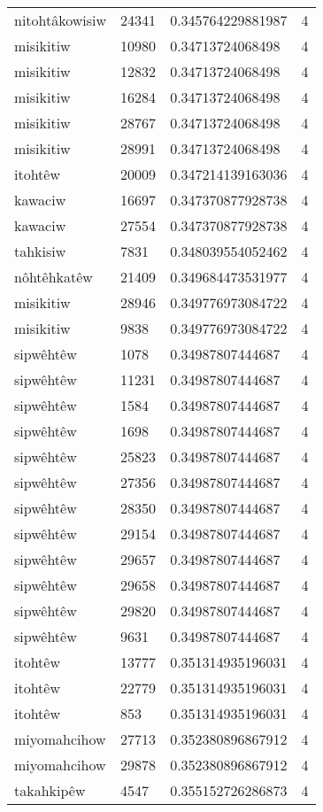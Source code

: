 \begin{longtable}{llll}
nitohtâkowisiw & 24341 & 0.345764229881987 & 4 \\
misikitiw & 10980 & 0.34713724068498 & 4 \\
misikitiw & 12832 & 0.34713724068498 & 4 \\
misikitiw & 16284 & 0.34713724068498 & 4 \\
misikitiw & 28767 & 0.34713724068498 & 4 \\
misikitiw & 28991 & 0.34713724068498 & 4 \\
itohtêw & 20009 & 0.347214139163036 & 4 \\
kawaciw & 16697 & 0.347370877928738 & 4 \\
kawaciw & 27554 & 0.347370877928738 & 4 \\
tahkisiw & 7831 & 0.348039554052462 & 4 \\
nôhtêhkatêw & 21409 & 0.349684473531977 & 4 \\
misikitiw & 28946 & 0.349776973084722 & 4 \\
misikitiw & 9838 & 0.349776973084722 & 4 \\
sipwêhtêw & 1078 & 0.34987807444687 & 4 \\
sipwêhtêw & 11231 & 0.34987807444687 & 4 \\
sipwêhtêw & 1584 & 0.34987807444687 & 4 \\
sipwêhtêw & 1698 & 0.34987807444687 & 4 \\
sipwêhtêw & 25823 & 0.34987807444687 & 4 \\
sipwêhtêw & 27356 & 0.34987807444687 & 4 \\
sipwêhtêw & 28350 & 0.34987807444687 & 4 \\
sipwêhtêw & 29154 & 0.34987807444687 & 4 \\
sipwêhtêw & 29657 & 0.34987807444687 & 4 \\
sipwêhtêw & 29658 & 0.34987807444687 & 4 \\
sipwêhtêw & 29820 & 0.34987807444687 & 4 \\
sipwêhtêw & 9631 & 0.34987807444687 & 4 \\
itohtêw & 13777 & 0.351314935196031 & 4 \\
itohtêw & 22779 & 0.351314935196031 & 4 \\
itohtêw & 853 & 0.351314935196031 & 4 \\
miyomahcihow & 27713 & 0.352380896867912 & 4 \\
miyomahcihow & 29878 & 0.352380896867912 & 4 \\
takahkipêw & 4547 & 0.355152726286873 & 4 \\

\end{longtable}
